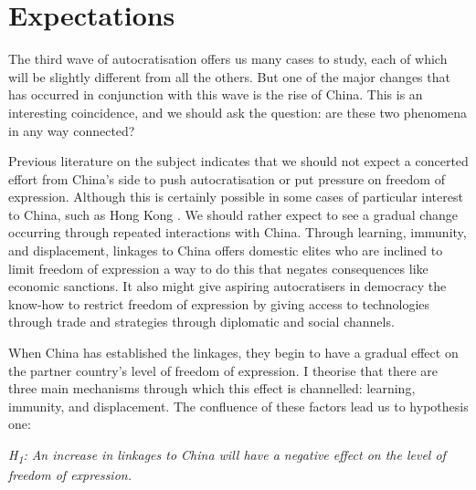 \section{Expectations} \label{sec:hypotheses}
The third wave of autocratisation offers us many cases to study, each of which will be slightly different from all the others. But one of the major changes that has occurred in conjunction with this wave is the rise of China. This is an interesting coincidence, and we should ask the question: are these two phenomena in any way connected?

Previous literature on the subject indicates that we should not expect a concerted effort from China's side to push autocratisation or put pressure on freedom of expression. Although this is certainly possible in some cases of particular interest to China, such as Hong Kong \citep{chen_democracy_2015}. We should rather expect to see a gradual change occurring through repeated interactions with China. Through learning, immunity, and displacement, linkages to China offers domestic elites who are inclined to limit freedom of expression a way to do this that negates consequences like economic sanctions. It also might give aspiring autocratisers in democracy the know-how to restrict freedom of expression by giving access to technologies through trade and strategies through diplomatic and social channels. 

When China has established the linkages, they begin to have a gradual effect on the partner country's level of freedom of expression. I theorise that there are three main mechanisms through which this effect is channelled: learning, immunity, and displacement. The confluence of these factors lead us to hypothesis one:
\begin{displayquote}
    \textit{H\textsubscript{1}: An increase in linkages to China will have a negative effect on the level of freedom of expression.}  
\end{displayquote}


